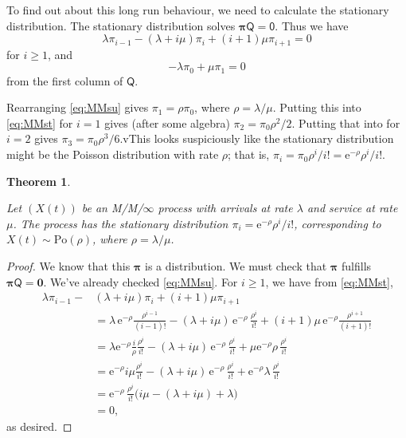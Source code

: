 \documentclass[
  a4paper,
]{article}
\newtheorem{theorem}{Theorem}[section]
\theoremstyle{definition}
\theoremstyle{definition}
\theoremstyle{definition}
\theoremstyle{remark}
\begin{document}
To find out about this long run behaviour, we need to calculate the stationary distribution. The stationary distribution solves \(\boldsymbol\pi\mathsf Q = \mathsf 0\). Thus we have
\begin{equation}
    \lambda \pi_{i-1} - (\lambda + i\mu)\pi_i + (i+1)\mu \pi_{i+1} = 0  \label{eq:MMst}
\end{equation}
for \(i \geq 1\), and
\begin{equation}
  -\lambda \pi_0 + \mu \pi_1 = 0  \label{eq:MMsu}
\end{equation}
from the first column of \(\mathsf Q\).

Rearranging \eqref{eq:MMsu} gives \(\pi_1 = \rho \pi_0\), where \(\rho = \lambda/\mu\). Putting this into \eqref{eq:MMst} for \(i = 1\) gives (after some algebra) \(\pi_2 = \pi_0 \rho^2 / 2\). Putting that into for \(i = 2\) gives \(\pi_3 = \pi_0 \rho^3 / 6\).vThis looks suspiciously like the stationary distribution might be the Poisson distribution with rate \(\rho\); that is, \(\pi_i = \pi_0 \rho^i / i! = \mathrm{e}^{-\rho} \rho^i / i!\).

\begin{theorem}
\protect\hypertarget{thm:MMinf-thm}{}\label{thm:MMinf-thm}

Let \((X(t))\) be an M/M/\(\infty\) process with arrivals at rate \(\lambda\) and service at rate \(\mu\). The process has the stationary distribution \(\pi_i = \mathrm{e}^{-\rho} \rho^i / i!\), corresponding to \(X(t) \sim \mathrm{Po}(\rho)\), where \(\rho = \lambda/\mu\).

\end{theorem}

\begin{proof}

We know that this \(\boldsymbol\pi\) is a distribution. We must check that \(\boldsymbol\pi\) fulfills \(\boldsymbol\pi \mathsf Q = \mathbf 0\). We've already checked \eqref{eq:MMsu}. For \(i \geq 1\), we have from \eqref{eq:MMst},
\begin{align*}
\lambda \pi_{i-1}{} - {}&(\lambda + i\mu)\pi_i + (i+1)\mu \pi_{i+1} \\
  &= \lambda\, \mathrm{e}^{-\rho} \frac{\rho^{i-1}}{(i-1)!} - (\lambda + i\mu) \,\mathrm{e}^{-\rho} \,\frac{\rho^i}{i!} + (i+1)\mu \,\mathrm{e}^{-\rho} \frac{\rho^{i+1}}{(i+1)!} \\
  &= \lambda \mathrm{e}^{-\rho}  \frac{i}{\rho} \frac{\rho^i}{i!} - (\lambda + i\mu) \,\mathrm{e}^{-\rho} \,\frac{\rho^i}{i!} + \mu \mathrm{e}^{-\rho} \rho \,\frac{\rho^i}{i!} \\
  &= \mathrm{e}^{-\rho} i\mu \frac{\rho^i}{i!} - (\lambda + i\mu) \,\mathrm{e}^{-\rho} \,\frac{\rho^i}{i!} + \mathrm{e}^{-\rho} \lambda \,\frac{\rho^i}{i!}\\
  &= \mathrm{e}^{-\rho} \,\frac{\rho^i}{i!} \big( i \mu   - (\lambda + i \mu) +   \lambda \big)  \\
  &= 0 ,
\end{align*}
as desired.

\end{proof}
\end{document}

